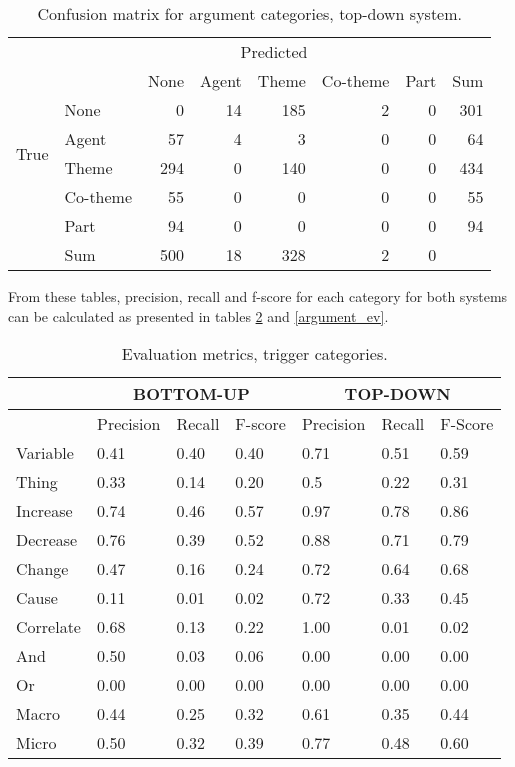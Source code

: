 \begin{table}
\begin{center}
\begin{tabular}{ | l | l | r | r | r | r | r | r | }
	\hline
	\multirow{8}{*}{True} & \multicolumn{7}{c|}{Predicted} \\ \cline{1-8}
	&\cellcolor{gray} & None & Agent & Theme & Co-theme & Part & Sum \\ \cline{2-8}
	&None & \cellcolor{g} 0 & 14 & 185 & 2 & 0 &  301 \\
	&Agent & 57 & \cellcolor{g} 4 & 3 & 0 & 0 & 64 \\
	&Theme & 294 & 0 & \cellcolor{g} 140 & 0 & 0 & 434 \\
	&Co-theme & 55 & 0 & 0 & \cellcolor{g} 0 & 0 & 55 \\
	&Part & 94 & 0 & 0 & 0 & \cellcolor{g} 0 & 94 \\ \hline	
	& Sum & 500 & 18 & 328 & 2 & 0 & \\ \hline
\end{tabular}
\end{center}
\caption{Confusion matrix for argument categories, top-down system.}
\label{pms_argument_conf}
\end{table}

From these tables, precision, recall and f-score for each category for both systems can be calculated as presented in tables \ref{trigger_ev} and \ref{argument_ev}. 

\begin{table}
\begin{center}
\begin{tabular}{ | l | l | l | l | l | l | l | }
	\hline
	\cellcolor{gray} & \multicolumn{3}{c}{BOTTOM-UP} & \multicolumn{3}{c|}{TOP-DOWN} \\ \hline
	\cellcolor{gray} & Precision & Recall & F-score & Precision & Recall & F-Score \\ \hline
	Variable & 0.41 & 0.40 & 0.40 & 0.71 & 0.51 & 0.59 \\
	Thing & 0.33 & 0.14 & 0.20 & 0.5 & 0.22 & 0.31 \\
	Increase & 0.74 & 0.46 & 0.57 & 0.97 & 0.78 & 0.86 \\
	Decrease & 0.76 & 0.39 & 0.52 & 0.88 & 0.71 & 0.79 \\ 
	Change & 0.47 & 0.16 & 0.24 & 0.72 & 0.64 & 0.68 \\ 
	Cause & 0.11 & 0.01 & 0.02 & 0.72 & 0.33 & 0.45 \\ 
	Correlate & 0.68 & 0.13 & 0.22 & 1.00 & 0.01 & 0.02 \\ 
	And & 0.50 & 0.03 & 0.06 & 0.00 & 0.00 & 0.00 \\
	Or & 0.00 & 0.00 & 0.00 & 0.00 & 0.00 & 0.00 \\ \hline
	Macro & 0.44 & 0.25 & 0.32 & 0.61 & 0.35 & 0.44 \\
	Micro & 0.50 & 0.32 & 0.39 & 0.77 & 0.48 & 0.60 \\ \hline
\end{tabular}
\end{center}
\caption{Evaluation metrics, trigger categories.}
\label{trigger_ev}
\end{table}

